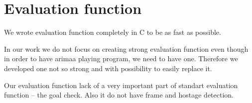 \section{Evaluation function}
We wrote evaluation function completely in C to be as fast as possible.

In our work we do not focus on creating strong evaluation function even though
in order to have arimaa playing program, we need to have one. Therefore we
developed one not so strong and with possibility to easily replace it.

Our evaluation function lack of a very important part of standart evaluation
function -- the goal check.
Also it do not have frame and hostage detection.
